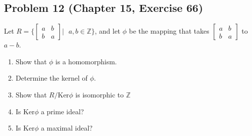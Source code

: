 \documentclass{article}
\begin{document}
\subsection*{Problem 12 (Chapter 15, Exercise 66)}
Let $R = \bigg\{ \begin{bmatrix} a & b \\ b & a \end{bmatrix} \bigg| \text{ }a, b \in \mathbb{Z}\bigg\}$, and let $\phi$ be the mapping that takes $\begin{bmatrix} a & b \\ b & a \end{bmatrix}$ to $a - b$.
\begin{enumerate}[label = (\alph*)]
    \item Show that $\phi$ is a homomorphism.
    \item Determine the kernel of $\phi$.
    \item Show that $R/\text{Ker} \phi$ is isomorphic to $\mathbb{Z}$
    \item Is $\text{Ker} \phi$ a prime ideal?
    \item Is $\text{Ker} \phi$ a maximal ideal?
    
\end{enumerate}
\end{document}
